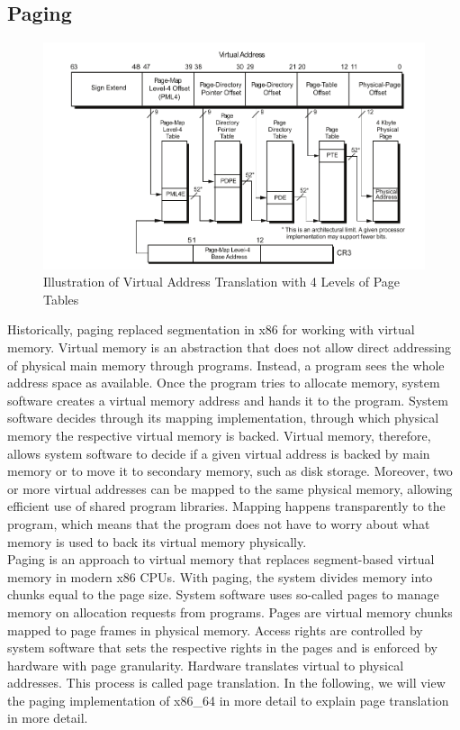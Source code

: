 \subsection{Paging}
\label{sec:state:technical:paging}
\begin{center}
    \begin{figure}
        \includegraphics[width=\textwidth]{images/paging_placeholder.png}
        \caption{Illustration of Virtual Address Translation with 4 Levels of Page Tables}
        \label{fig:state:technical:paging}
    \end{figure}
\end{center}

Historically, paging replaced segmentation in x86 for working with virtual
memory. Virtual memory is an abstraction that does not allow direct addressing
of physical main memory through programs. Instead, a program sees the whole
address space as available. Once the program tries to allocate memory, system
software creates a virtual memory address and hands it to the program. System
software decides through its mapping implementation, through which physical
memory the respective virtual memory is backed. Virtual memory, therefore,
allows system software to decide if a given virtual address is backed by main
memory or to move it to secondary memory, such as disk storage. Moreover, two or
more virtual addresses can be mapped to the same physical memory, allowing
efficient use of shared program libraries. Mapping happens transparently to the
program, which means that the program does not have to worry about what memory
is used to back its virtual memory physically.\\

Paging is an approach to virtual memory that replaces segment-based virtual
memory in modern x86 CPUs. With paging, the system divides memory into chunks
equal to the page size. System software uses so-called pages to manage memory on
allocation requests from programs. Pages are virtual memory chunks mapped to
page frames in physical memory. Access rights are controlled by system software
that sets the respective rights in the pages and is enforced by hardware with
page granularity. Hardware translates virtual to physical addresses. This
process is called page translation. In the following, we will view the paging
implementation of x86\_64 in more detail to explain page translation in more
detail.\\

